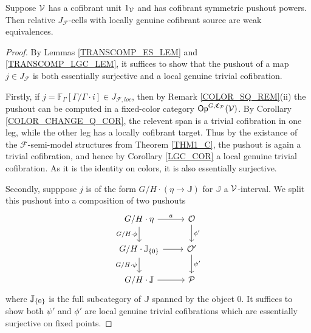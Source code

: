 \documentclass[a4paper,10pt
,draft
]{article}%
\renewcommand{\F}{\mathcal F}
\newcommand{\J}{\mathbb J}
\renewcommand{\1}{\eta}%
\begin{document}
\begin{proposition}
      \label{J-CELL_PROP}
      Suppose $\mathcal V$ has a cofibrant unit $1_{\mathcal V}$ and has cofibrant symmetric pushout powers.
      Then relative $J_{\F}$-cells with locally genuine cofibrant source are weak equivalences.
\end{proposition}
\begin{proof}
      By Lemmas \ref{TRANSCOMP_ES_LEM} and \ref{TRANSCOMP_LGC_LEM}, it suffices to show that
      the pushout of a map $j \in J_\F$ is both
      essentially surjective and a local genuine trivial cofibration.

      Firstly, if $j = \mathbb F_\Gamma[\Gamma/\Gamma \cdot i] \in J_{\F, loc}$,
      then by Remark \ref{COLOR_SQ_REM}(ii) the pushout can be computed in a fixed-color category $\mathsf{Op}^{G,\mathfrak C_{\mathcal{P}}}(\mathcal V)$.
      By Corollary \ref{COLOR_CHANGE_Q_COR}, the relevent span is a trivial cofibration in one leg, while the other leg has a locally cofibrant target.
      Thus by the existance of the $\F$-semi-model structures from Theorem \ref{THM1_C},
      the pushout is again a trivial cofibration, and hence by Corollary \ref{LGC_COR} a local genuine trivial cofibration.
      As it is the identity on colors, it is also essentially surjective.

      Secondly, supppose $j$ is of the form $G/H \cdot (\1 \to \J)$ for $\J$ a $\mathcal V$-interval.
      We split this pushout into a composition of two pushouts
      \begin{equation}
            \begin{tikzcd}
                  G/H \cdot \1 \arrow[r, "a"] \arrow[d, "G/H \cdot \phi"']
                  &
                  \O \arrow[d,"\phi'"]
                  \\
                  G/H \cdot \J_{\set{0}} \arrow[r] \arrow[d, "G/H \cdot \psi"']
                  &
                  \O' \arrow[d,"\psi'"]
                  \\
                  G/H \cdot \J \arrow[r]
                  &
                  \P
            \end{tikzcd}
      \end{equation}
      where $\J_{\set{0}}$ is the full subcategory of $\J$ spanned by the object $0$.
      It suffices to show both $\psi'$ and $\phi'$ are local genuine trivial cofibrations which are essentially surjective on fixed points. 


\end{proof}
\end{document}

